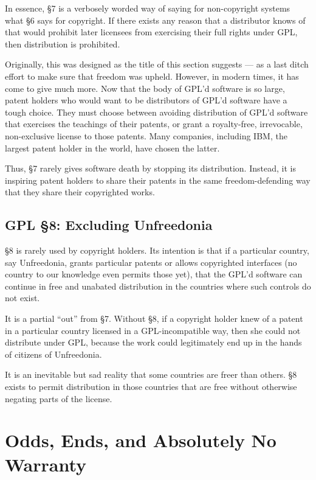 \documentclass[11pt, letterpaper]{book}
\begin{document}
In essence, \S 7 is a verbosely worded way of saying for non-copyright
systems what \S 6 says for copyright. If there exists any reason that a
distributor knows of that would prohibit later licensees from exercising
their full rights under GPL, then distribution is prohibited.

Originally, this was designed as the title of this section suggests --- as
a last ditch effort to make sure that freedom was upheld. However, in
modern times, it has come to give much more. Now that the body of GPL'd
software is so large, patent holders who would want to be distributors of
GPL'd software have a tough choice. They must choose between avoiding
distribution of GPL'd software that exercises the teachings of their
patents, or grant a royalty-free, irrevocable, non-exclusive license to
those patents. Many companies, including IBM, the largest patent holder
in the world, have chosen the latter.

Thus, \S 7 rarely gives software death by stopping its distribution.
Instead, it is inspiring patent holders to share their patents in the same
freedom-defending way that they share their copyrighted works.

\section{GPL \S 8: Excluding Unfreedonia}
\label{GPLs8}

\S 8 is rarely used by copyright holders. Its intention is that if a
particular country, say Unfreedonia, grants particular patents or allows
copyrighted interfaces (no country to our knowledge even permits those
yet), that the GPL'd software can continue in free and unabated
distribution in the countries where such controls do not exist.

It is a partial ``out'' from \S 7. Without \S 8, if a copyright holder
knew of a patent in a particular country licensed in a GPL-incompatible
way, then she could not distribute under GPL, because the work could
legitimately end up in the hands of citizens of Unfreedonia.

It is an inevitable but sad reality that some countries are freer than
others. \S 8 exists to permit distribution in those countries that are
free without otherwise negating parts of the license.

\chapter{Odds, Ends, and Absolutely No Warranty}
\end{document}

